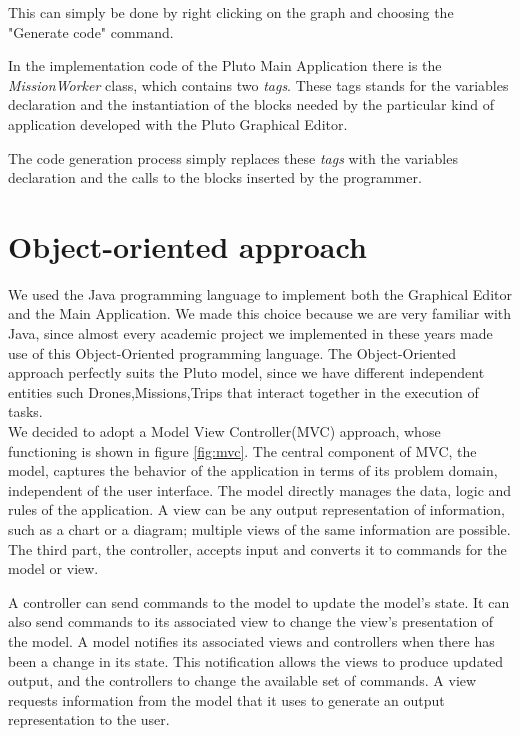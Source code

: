 This can simply be done by right clicking on the graph and choosing the "Generate code" command.

In the implementation code of the Pluto Main Application there is the \textit{MissionWorker} class, which contains two \textit{tags}.
These tags stands for the variables declaration and the instantiation of the blocks needed by the particular kind of application developed with the Pluto Graphical Editor.

The code generation process simply replaces these \textit{tags} with the variables declaration and the calls to the blocks inserted by the programmer.




\section{Object-oriented approach}\label{oomodel}

We used the Java programming language to implement both the Graphical Editor and the Main Application.
We made this choice because we are very familiar with Java, since almost every academic project we implemented in these years made use of this Object-Oriented programming language.
The Object-Oriented approach perfectly suits the Pluto model, since we have different independent entities such Drones,Missions,Trips that interact together in the execution of tasks.
\\

We decided to adopt a Model View Controller(MVC) approach, whose functioning is shown in figure \ref{fig:mvc}.
The central component of MVC, the model, captures the behavior of the application in terms of its problem domain, independent of the user interface.
The model directly manages the data, logic and rules of the application.
A view can be any output representation of information, such as a chart or a diagram; multiple views of the same information are possible.
The third part, the controller, accepts input and converts it to commands for the model or view.

A controller can send commands to the model to update the model's state.
It can also send commands to its associated view to change the view's presentation of the model.
A model notifies its associated views and controllers when there has been a change in its state. This notification allows the views to produce updated output, and the controllers to change the available set of commands.
A view requests information from the model that it uses to generate an output representation to the user.

